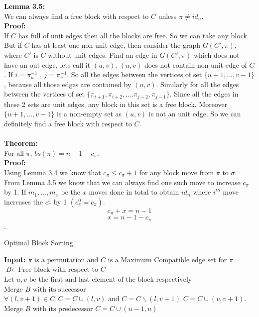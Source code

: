 \documentclass[BTech]{iitmdiss}
\begin{document}
\noindent
\textbf{Lemma 3.5:}\\
We can always find a free block with respect to $C$ unless $\pi \neq id_n$.\\
\textbf{Proof:}\\
If $C$ has full of unit edges then all the blocks are free. So we can take any block. But if $C$ has at least one non-unit edge, then consider the graph $G(C',\pi)$, where $C'$ is $C$ without unit edges. Find an edge in $G(C',\pi)$ which does not have an out edge, lets call it $(u,v)$. $(u,v)$ does not contain non-unit edge of $C$. If $i = \pi^{-1}_u$ , $j = \pi^{-1}_v$. So all the edges between the vertices of set $\{u+1,...,v-1\}$, because all those edges are contained by $(u,v)$. Similarly for all the edges between the vertices of set $\{\pi_{i+1},\pi_{i+2},....\pi_{j-2},\pi_{j-1}\}$. Since all the edges in these 2 sets are unit edges, any block in this set is a free block. Moreover $\{u+1,...,v-1\}$ is a non-empty set as $(u,v)$ is not an unit edge. So we can definitely find a free block with respect to $C$.\\~\\
\textbf{Theorem:}\\
For all $\pi$, $bs(\pi) = n-1-c_{\pi}$.\\
\textbf{Proof:}\\
Using Lemma 3.4 we know that $c_\pi \leq c_\sigma + 1$ for any block move from $\pi$ to $\sigma$. From Lemma 3.5 we know that we can always find one such move to increase $c_{\pi}$ by 1. If $m_1,...,m_x$ be the $x$ moves done in total to obtain $id_n$ where $i^{th}$ move increases the $c^i_{\pi}$ by 1 $(c^0_{\pi} = c_{\pi})$.  $$c_{\pi} + x = n-1$$ $$x = n-1-c_{\pi}$$. 


\begin{algorithm}
\caption{Optimal Block Sorting}\label{euclid}
\begin{algorithmic}[1]
\State \textbf{Input: } $\pi \text{ is a permutation and }\textit{C} \text{ is a Maximum Compatible edge set for } \pi$ 
\State $\textit{B} \gets \text{Free block with respect to }\textit{C}$
\State $\text{Let } u,v \text{ be the first and last element of the block respectively}$
\State $\text{Merge } \textit{B} \text{ with its successor}$
\State $\forall (l,v+1) \in C, C = C\cup(l,v) \text{ and } C=C\backslash(l,v+1) $
\State $C = C\cup(v,v+1)$.
\Else
\State $\text{Merge } \textit{B} \text{ with its predecessor}$
\State $C = C\cup(u-1,u)$
\EndIf
\EndWhile
\EndProcedure
\end{algorithmic}
\end{algorithm}
\end{document}
